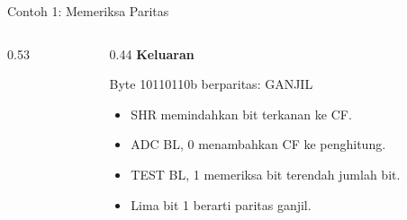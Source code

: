 \documentclass[aspectratio=169,11pt]{beamer}
\begin{document}
\begin{frame}[fragile]{Contoh 1: Memeriksa Paritas}
\begin{columns}[t]
\begin{column}{0.53\textwidth}
\end{column}
\begin{column}{0.44\textwidth}
\footnotesize
{\color{obeTeal}\bfseries Keluaran}\\[0.15em]
\begin{keluaran}
Byte 10110110b berparitas: GANJIL
\end{keluaran}

\vspace{0.3em}
\begin{itemize}
    \item SHR memindahkan bit terkanan ke CF.
    \item ADC BL, 0 menambahkan CF ke penghitung.
    \item TEST BL, 1 memeriksa bit terendah jumlah bit.
    \item Lima bit 1 berarti paritas ganjil.
\end{itemize}
\end{column}
\end{columns}
\end{frame}
\end{document}
